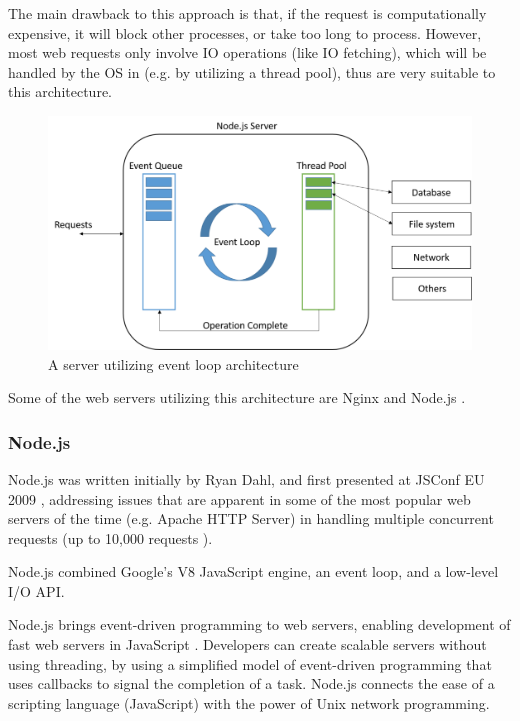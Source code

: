 The main drawback to this approach is that, if the request is computationally expensive, it will block other processes, or take too long to process. However, most web requests only involve IO operations (like IO fetching), which will be handled by the OS in (e.g. by utilizing a thread pool), thus are very suitable to this architecture.

\begin{figure}[!h]
	\centering
	\includegraphics[scale=0.4]{Picture/server/event-loop-server.png}
	\caption{A server utilizing event loop architecture}
\label{fig:event-loop-server}
\end{figure}

Some of the web servers utilizing this architecture are Nginx \cite{nginx} and Node.js \cite{nodejs}.

\subsubsection{Node.js}
Node.js was written initially by Ryan Dahl, and first presented at JSConf EU 2009 \cite{jsconf}, addressing issues that are apparent in some of the most popular web servers of the time (e.g. Apache HTTP Server) in handling multiple concurrent requests (up to 10,000 requests \cite{c10k}).

Node.js combined Google's V8 JavaScript engine, an event loop, and a low-level I/O API. \cite{nodejs_structure}

Node.js brings event-driven programming to web servers, enabling development of fast web servers in JavaScript \cite{nodejs_structure}. Developers can create scalable servers without using threading, by using a simplified model of event-driven programming that uses callbacks to signal the completion of a task. Node.js connects the ease of a scripting language (JavaScript) with the power of Unix network programming. \cite{nodejs_structure}

